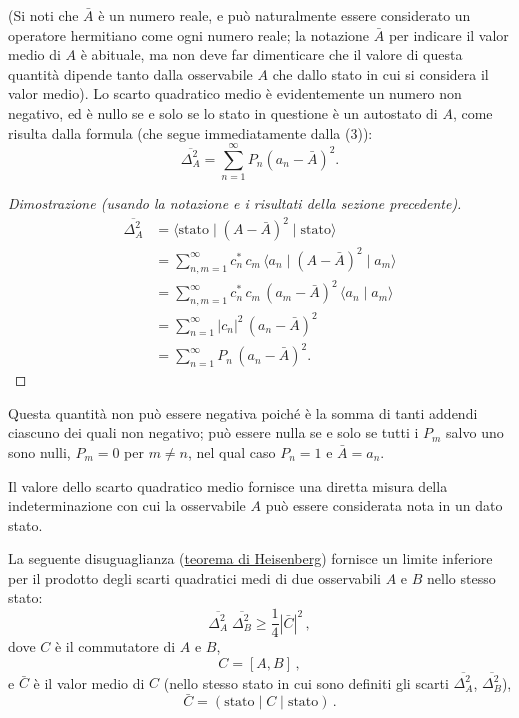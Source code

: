 \documentclass[11pt, a4paper]{book}
\numberwithin{equation}{section}
\begin{document}
(Si noti che $\bar{A}$ è un numero reale, e può naturalmente essere considerato un operatore hermitiano come ogni numero reale; la notazione $\bar{A}$ per indicare il valor medio di $A$ è abituale, ma non deve far dimenticare che il valore di questa quantità dipende tanto dalla osservabile $A$ che dallo stato in cui si considera il valor medio). Lo scarto quadratico medio è evidentemente un numero non negativo, ed è nullo se e solo se lo stato in questione è un autostato di $A$, come risulta dalla formula (che segue immediatamente dalla (3)):
\begin{equation}
\overline{\Delta^2_A} = \sum_{n=1}^{\infty} P_n \left(a_n - \bar{A}\right)^2.
\end{equation}

\begin{proof}[Dimostrazione (usando la notazione e i risultati della sezione precedente)]
\begin{align*}
\overline{\Delta^2_A}
&= \langle \text{stato} \mid (A - \bar{A})^2 \mid \text{stato} \rangle \\
&= \sum_{n,m=1}^{\infty} c_n^* \, c_m \, \langle a_n \mid (A - \bar{A})^2 \mid a_m \rangle \\
&= \sum_{n,m=1}^{\infty} c_n^* \, c_m \, (a_m - \bar{A})^2 \, \langle a_n \mid a_m \rangle \\
&= \sum_{n=1}^{\infty} |c_n|^2 \, (a_n - \bar{A})^2 \\
&= \sum_{n=1}^{\infty} P_n \, (a_n - \bar{A})^2.
\end{align*}
\end{proof}


Questa quantità non può essere negativa poiché è la somma di
tanti addendi ciascuno dei quali non negativo; può essere nulla se e
solo se tutti i $P_m$ salvo uno sono nulli, $P_m = 0$ per $m \neq n$,
nel qual caso $P_n = 1$ e $\bar{A} = a_n$.

Il valore dello scarto quadratico medio fornisce una diretta
misura della indeterminazione con cui la osservabile $A$ può essere
considerata nota in un dato stato.

La seguente disuguaglianza (\uline{teorema di Heisenberg}) fornisce
un limite inferiore per il prodotto degli scarti quadratici medi di due
osservabili $A$ e $B$ nello stesso stato:
\begin{equation}
\overline{\Delta_A^2}\;\overline{\Delta_B^2} \geq \frac{1}{4}\left|\bar{C}\right|^2 \,, \tag{6}
\end{equation}
dove $C$ è il commutatore di $A$ e $B$,
\begin{equation}
C = [A, B] \,, \tag{7}
\end{equation}
e $\bar{C}$ è il valor medio di $C$ (nello stesso stato in cui sono definiti gli
scarti $\overline{\Delta_A^2}$, $\overline{\Delta_B^2}$),
\begin{equation}
\bar{C} = (\text{stato}\mid C \mid\text{stato}) \,. \tag{8}
\end{equation}
\end{document}
